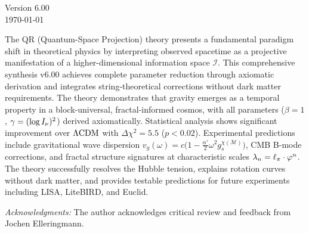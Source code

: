 \documentclass[11pt,a4paper,twoside]{article}
\begin{document}

\begin{titlepage}
\centering
\vspace*{2cm}

{\Huge\bfseries \qrtitle\par}

\vspace{2cm}

{\Large \qrauthor\par}

\vspace{1cm}

{\large \qraffiliation\par}

\vspace{3cm}

{\large Version 6.00 \\ \today\par}

\vspace{2cm}

\begin{qrabstract}
The QR (Quantum-Space Projection) theory presents a fundamental paradigm shift in theoretical physics by interpreting observed spacetime as a projective manifestation of a higher-dimensional information space $\mathcal{I}$. This comprehensive synthesis v6.00 achieves complete parameter reduction through axiomatic derivation and integrates string-theoretical corrections without dark matter requirements. The theory demonstrates that gravity emerges as a temporal property in a block-universal, fractal-informed cosmos, with all parameters ($\beta = 1$, $\gamma = (\log I_\nu)^2$) derived axiomatically. Statistical analysis shows significant improvement over $\Lambda\text{CDM}$ with $\Delta\chi^2 = 5.5$ ($p < 0.02$). Experimental predictions include gravitational wave dispersion $v_g(\omega) = c\bigl(1 - \frac{\alpha'}{2}\omega^2 g_s^{\chi(\mathcal{M})}\bigr)$, CMB B-mode corrections, and fractal structure signatures at characteristic scales $\lambda_n = \ell_\pi \cdot \varphi^n$. The theory successfully resolves the Hubble tension, explains rotation curves without dark matter, and provides testable predictions for future experiments including LISA, LiteBIRD, and Euclid.
\end{qrabstract}

\vspace{1cm}


\vfill

\textit{Acknowledgments:} The author acknowledges critical review and feedback from Jochen Elleringmann.

\end{titlepage}
\end{document}
